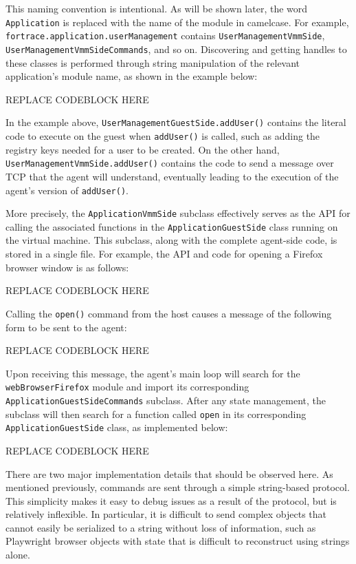 This naming convention is intentional. As will be shown later, the word
\texttt{Application} is replaced with the name of the module in
camelcase. For example, \texttt{fortrace.application.userManagement}
contains \texttt{UserManagementVmmSide},
\texttt{UserManagementVmmSideCommands}, and so on. Discovering and
getting handles to these classes is performed through string
manipulation of the relevant application's module name, as shown in the
example below:

REPLACE CODEBLOCK HERE

In the example above, \texttt{UserManagementGuestSide.addUser()}
contains the literal code to execute on the guest when
\texttt{addUser()} is called, such as adding the registry keys needed
for a user to be created. On the other hand,
\texttt{UserManagementVmmSide.addUser()} contains the code to send a
message over TCP that the agent will understand, eventually leading to
the execution of the agent's version of \texttt{addUser()}.

More precisely, the \texttt{ApplicationVmmSide} subclass effectively
serves as the API for calling the associated functions in the
\texttt{ApplicationGuestSide} class running on the virtual machine. This
subclass, along with the complete agent-side code, is stored in a single
file. For example, the API and code for opening a Firefox browser window
is as follows:

REPLACE CODEBLOCK HERE

Calling the \texttt{open()} command from the host causes a message of
the following form to be sent to the agent:

REPLACE CODEBLOCK HERE

Upon receiving this message, the agent's main loop will search for the
\texttt{webBrowserFirefox} module and import its corresponding
\texttt{ApplicationGuestSideCommands} subclass. After any state
management, the subclass will then search for a function called
\texttt{open} in its corresponding \texttt{ApplicationGuestSide} class,
as implemented below:

REPLACE CODEBLOCK HERE

There are two major implementation details that should be observed here.
As mentioned previously, commands are sent through a simple string-based
protocol. This simplicity makes it easy to debug issues as a result of
the protocol, but is relatively inflexible. In particular, it is
difficult to send complex objects that cannot easily be serialized to a
string without loss of information, such as Playwright browser objects
with state that is difficult to reconstruct using strings alone.

